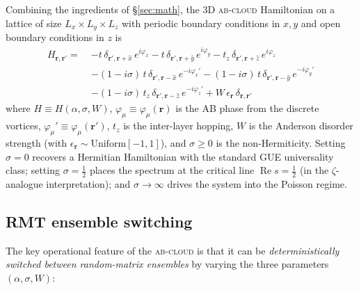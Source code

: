 \documentclass[11pt,a4paper]{article}
\theoremstyle{plain}
\theoremstyle{definition}
\theoremstyle{remark}
\newcommand{\Abcloud}{\textsc{ab-cloud}}
\begin{document}
Combining the ingredients of \S\ref{sec:math}, the 3D \Abcloud{} Hamiltonian on a lattice of size $L_x\times L_y\times L_z$ with periodic boundary conditions in $x,y$ and open boundary conditions in $z$ is
\begin{equation}\label{eq:ABcloud}
\boxed{
\begin{aligned}
    H_{\mathbf{r},\mathbf{r}'} =\;& -t\,\delta_{\mathbf{r}',\mathbf{r}+\hat x}\,e^{i\varphi_x} - t\,\delta_{\mathbf{r}',\mathbf{r}+\hat y}\,e^{i\varphi_y} - t_z\,\delta_{\mathbf{r}',\mathbf{r}+\hat z}\,e^{i\varphi_z} \\
    & - (1\!-\!i\sigma)\,t\,\delta_{\mathbf{r}',\mathbf{r}-\hat x}\,e^{-i\varphi_x'} - (1\!-\!i\sigma)\,t\,\delta_{\mathbf{r}',\mathbf{r}-\hat y}\,e^{-i\varphi_y'} \\
    & - (1\!-\!i\sigma)\,t_z\,\delta_{\mathbf{r}',\mathbf{r}-\hat z}\,e^{-i\varphi_z'} + W\,\epsilon_{\mathbf{r}}\,\delta_{\mathbf{r},\mathbf{r}'}
\end{aligned}
}
\end{equation}
where $H\equiv H(\alpha,\sigma,W)$, $\varphi_\mu\equiv\varphi_\mu(\mathbf{r})$ is the AB phase from the discrete vortices, $\varphi_\mu'\equiv\varphi_\mu(\mathbf{r}')$, $t_z$ is the inter-layer hopping, $W$ is the Anderson disorder strength (with $\epsilon_{\mathbf{r}}\sim\mathrm{Uniform}[-1,1]$), and $\sigma\ge 0$ is the non-Hermiticity. Setting $\sigma = 0$ recovers a Hermitian Hamiltonian with the standard GUE universality class; setting $\sigma = \tfrac{1}{2}$ places the spectrum at the critical line $\operatorname{Re}s = \tfrac{1}{2}$ (in the $\zeta$-analogue interpretation); and $\sigma\!\to\!\infty$ drives the system into the Poisson regime.

\subsection{RMT ensemble switching}

The key operational feature of the \Abcloud{} is that it can be \emph{deterministically switched between random-matrix ensembles} by varying the three parameters $(\alpha, \sigma, W)$:
\end{document}
